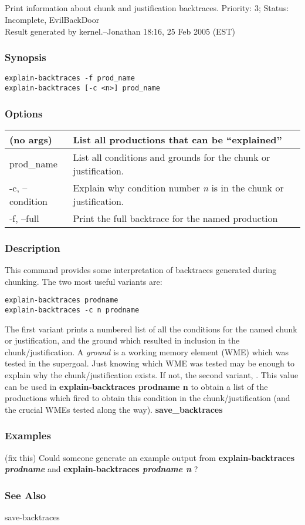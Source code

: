 \subsection{}
\label{explain-backtraces}
Print information about chunk and justification backtraces. 
 Priority: 3; Status: Incomplete, EvilBackDoor\\ 
Result generated by kernel.--Jonathan 18:16, 25 Feb 2005 (EST) 
\subsubsection*{Synopsis}
\begin{verbatim}
explain-backtraces -f prod_name
explain-backtraces [-c <n>] prod_name
\end{verbatim}
\subsubsection*{Options}
\begin{tabular}{|l|l|}
\hline 
 (no args)  & List all productions that can be ``explained''  \\
 \hline 
 prod\_name  & List all conditions and grounds for the chunk or justification.  \\
 \hline 
 -c, --condition  & Explain why condition number \emph{n}
 is in the chunk or justification.  \\
 \hline 
 -f, --full  & Print the full backtrace for the named production  \\
 \hline 
\end{tabular}
\subsubsection*{Description}
 This command provides some interpretation of backtraces generated during chunking. 
 The two most useful variants are: \begin{verbatim}
explain-backtraces prodname 
explain-backtraces -c n prodname
\end{verbatim}
 The first variant prints a numbered list of all the conditions for the named chunk or justification, and the ground which resulted in inclusion in the chunk/justification. A \emph{ground}
 is a working memory element (WME) which was tested in the supergoal. Just knowing which WME was tested may be enough to explain why the chunk/justification exists. If not, the second variant, . This value can be used in \textbf{explain-backtraces prodname n}
 to obtain a list of the productions which fired to obtain this condition in the chunk/justification (and the crucial WMEs tested along the way). 
 \textbf{save\_backtraces}
\subsubsection*{Examples}
 (fix this) 
 Could someone generate an example output from 
 \textbf{explain-backtraces \emph{prodname}
}
 and 
 \textbf{explain-backtraces \emph{prodname n}
}
? 
\subsubsection*{See Also}
 save-backtraces
